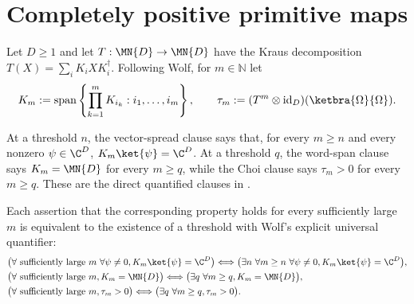 \section{Completely positive primitive maps}

Let $D\geq1$ and let $T:\MN{D}\to\MN{D}$ have the Kraus decomposition
$T(X)=\sum_i K_iXK_i^\dagger$. Following Wolf, for $m\in\mathbb N$ let
\begin{align}
    K_m
    :=\operatorname{span}\left\{
        \prod_{k=1}^{m}K_{i_k}:i_1,\ldots,i_m
      \right\},
    \qquad
    \tau_m
    :=(T^m\otimes\operatorname{id}_D)
      (\ketbra{\Omega}{\Omega}).
    \notag
\end{align}

\begin{definition}
    \label{def:wolf_6_8_explicit_thresholds}
    \leanok
    At a threshold $n$, the vector-spread clause says that, for every
    $m\geq n$ and every nonzero $\psi\in\C^D$,
    $K_m\ket{\psi}=\C^D$. At a threshold $q$, the word-span clause says
    $K_m=\MN{D}$ for every $m\geq q$, while the Choi clause says
    $\tau_m>0$ for every $m\geq q$.
    These are the direct quantified clauses in
    \cite[Theorem~6.8(2--4)]{Wolf2012Quantum}.
\end{definition}

\begin{theorem}
    \label{thm:wolf_6_8_eventual_thresholds}
    \leanok
    Each assertion that the corresponding property holds for every
    sufficiently large $m$ is equivalent to the existence of a threshold
    with Wolf's explicit universal quantifier:
    \begin{align}
        &\bigl(\forall\text{ sufficiently large }m\ \forall\psi\neq0,
          K_m\ket{\psi}=\C^D\bigr)
          \Longleftrightarrow
          \bigl(\exists n\ \forall m\geq n\ \forall\psi\neq0,
          K_m\ket{\psi}=\C^D\bigr), \notag\\
        &\bigl(\forall\text{ sufficiently large }m, K_m=\MN{D}\bigr)
          \Longleftrightarrow
          \bigl(\exists q\ \forall m\geq q, K_m=\MN{D}\bigr), \notag\\
        &\bigl(\forall\text{ sufficiently large }m, \tau_m>0\bigr)
          \Longleftrightarrow
          \bigl(\exists q\ \forall m\geq q, \tau_m>0\bigr).
          \notag
    \end{align}
\end{theorem}

